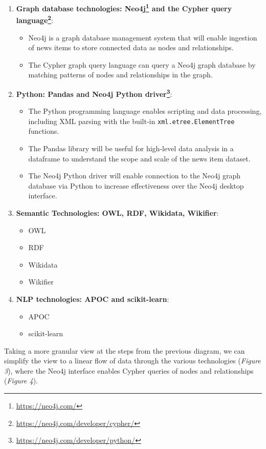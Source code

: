 \documentclass[11pt]{article}
\begin{document}
\begin{enumerate}
  \item \textbf{Graph database technologies: Neo4j\footnote{\url{https://neo4j.com/}} and the Cypher query language\footnote{\url{https://neo4j.com/developer/cypher/}}}:
  \begin{itemize}
    \item Neo4j is a graph database management system that will enable ingestion of news items to store connected data as nodes and relationships.
    \item The Cypher graph query language can query a Neo4j graph database by matching patterns of nodes and relationships in the graph.
  \end{itemize}
  \item \textbf{Python: Pandas and Neo4j Python driver\footnote{\url{https://neo4j.com/developer/python/}}}:
  \begin{itemize}
    \item The Python programming language enables scripting and data processing, including XML parsing with the built-in \verb+xml.etree.ElementTree+ functions.
    \item The Pandas library will be useful for high-level data analysis in a dataframe to understand the scope and scale of the news item dataset.
    \item The Neo4j Python driver will enable connection to the Neo4j graph database via Python to increase effectiveness over the Neo4j desktop interface.
  \end{itemize}
  \item \textbf{Semantic Technologies: OWL, RDF, Wikidata, Wikifier}:
  \begin{itemize}
    \item OWL
    \item RDF
    \item Wikidata
    \item Wikifier
  \end{itemize}
  \item \textbf{NLP technologies: APOC and scikit-learn}:
  \begin{itemize}
    \item APOC
    \item scikit-learn
  \end{itemize}
\end{enumerate}

Taking a more granular view at the steps from the previous diagram, we can simplify the view to a linear flow of data through the various technologies (\textit{Figure 3}), where the Neo4j interface enables Cypher queries of nodes and relationships (\textit{Figure 4}).
\end{document}
